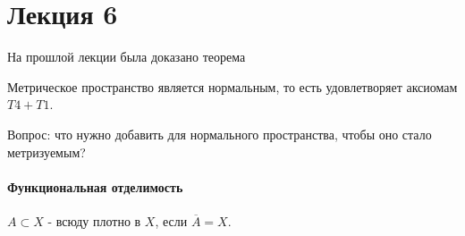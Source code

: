 \section{Лекция 6}

На прошлой лекции была доказано теорема
\begin{theorem}
    Метрическое пространство является нормальным, то есть удовлетворяет аксиомам $T4 + T1$.
\end{theorem}

Вопрос: что нужно добавить для нормального пространства, чтобы оно стало метризуемым?

\paragraph{Функциональная отделимость}

    

\begin{definition}
    $A \subset X$ - всюду плотно в $X$, если $\overline{A} = X$.
\end{definition}

